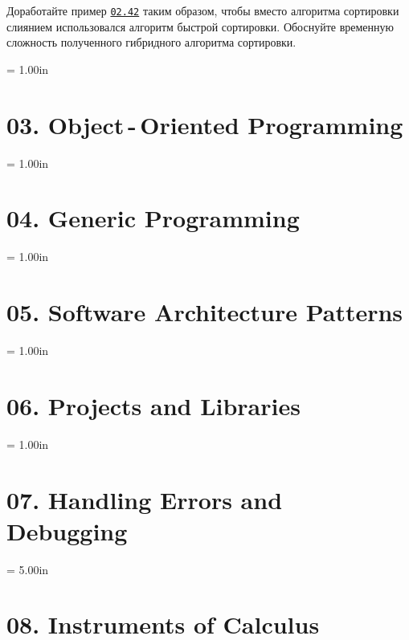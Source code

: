 \documentclass[a4paper,12pt]{article}
\begin{document}
Доработайте пример \href{https://github.com/i-s-m-mipt/Education/blob/master/projects/examples/source/02.42.cpp}{\texttt{02.42}} таким образом, чтобы вместо алгоритма сортировки слиянием использовался алгоритм быстрой сортировки. Обоснуйте временную сложность полученного гибридного алгоритма сортировки.



\newpage\thispagestyle{empty}\pdfpageheight = 1.00in\enlargethispage{100in}

\section{03. Object\,-\,Oriented Programming}



\newpage\thispagestyle{empty}\pdfpageheight = 1.00in\enlargethispage{100in}

\section{04. Generic Programming}



\newpage\thispagestyle{empty}\pdfpageheight = 1.00in\enlargethispage{100in}

\section{05. Software Architecture Patterns}



\newpage\thispagestyle{empty}\pdfpageheight = 1.00in\enlargethispage{100in}

\section{06. Projects and Libraries}



\newpage\thispagestyle{empty}\pdfpageheight = 1.00in\enlargethispage{100in}

\section{07. Handling Errors and Debugging}



\newpage\thispagestyle{empty}\pdfpageheight = 5.00in\enlargethispage{100in}

\section{08. Instruments of Calculus}
\end{document}
